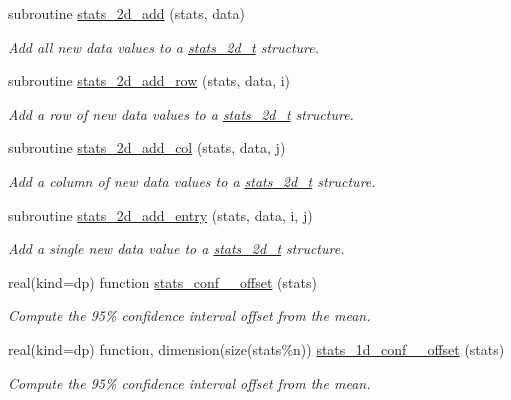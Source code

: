 \begin{DoxyCompactItemize}
subroutine \mbox{\hyperlink{namespacepmc__stats_adf44b0b2ca237de63a455f077ad5c51e}{stats\+\_\+2d\+\_\+add}} (stats, data)
\begin{DoxyCompactList}\small\item\em Add all new data values to a {\ttfamily \mbox{\hyperlink{structpmc__stats_1_1stats__2d__t}{stats\+\_\+2d\+\_\+t}}} structure. \end{DoxyCompactList}\item 
subroutine \mbox{\hyperlink{namespacepmc__stats_a130511c11730c58ad4e4a75eece0330b}{stats\+\_\+2d\+\_\+add\+\_\+row}} (stats, data, i)
\begin{DoxyCompactList}\small\item\em Add a row of new data values to a {\ttfamily \mbox{\hyperlink{structpmc__stats_1_1stats__2d__t}{stats\+\_\+2d\+\_\+t}}} structure. \end{DoxyCompactList}\item 
subroutine \mbox{\hyperlink{namespacepmc__stats_a3d4adead65ab33601c8d28a1edb89755}{stats\+\_\+2d\+\_\+add\+\_\+col}} (stats, data, j)
\begin{DoxyCompactList}\small\item\em Add a column of new data values to a {\ttfamily \mbox{\hyperlink{structpmc__stats_1_1stats__2d__t}{stats\+\_\+2d\+\_\+t}}} structure. \end{DoxyCompactList}\item 
subroutine \mbox{\hyperlink{namespacepmc__stats_ab357ab9aa317d0059079eb870bfc17eb}{stats\+\_\+2d\+\_\+add\+\_\+entry}} (stats, data, i, j)
\begin{DoxyCompactList}\small\item\em Add a single new data value to a {\ttfamily \mbox{\hyperlink{structpmc__stats_1_1stats__2d__t}{stats\+\_\+2d\+\_\+t}}} structure. \end{DoxyCompactList}\item 
real(kind=dp) function \mbox{\hyperlink{namespacepmc__stats_a9cecea8dc7d64a4b8800f09e7bc2d54f}{stats\+\_\+conf\+\_\+\_\+offset}} (stats)
\begin{DoxyCompactList}\small\item\em Compute the 95\% confidence interval offset from the mean. \end{DoxyCompactList}\item 
real(kind=dp) function, dimension(size(stats\%n)) \mbox{\hyperlink{namespacepmc__stats_abb0f22506fbe1564d5dfe9b348967e3f}{stats\+\_\+1d\+\_\+conf\+\_\+\_\+offset}} (stats)
\begin{DoxyCompactList}\small\item\em Compute the 95\% confidence interval offset from the mean. \end{DoxyCompactList}\item 

\end{DoxyCompactItemize}
